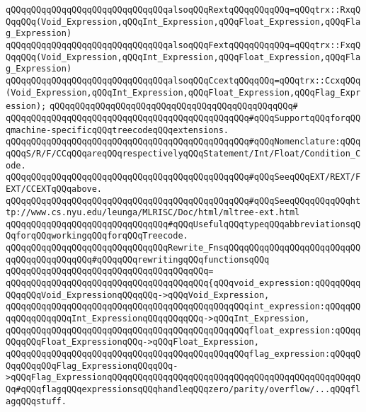 \verb|qQQqqQQqqQQqqQQqqQQqqQQqqQQqqQQqalsoqQQqRextqQQqqQQqqQQq=qQQqtrx::RxqQQqqQQq(Void_Expression,qQQqInt_Expression,qQQqFloat_Expression,qQQqFlag_Expression)|\newline
\verb|qQQqqQQqqQQqqQQqqQQqqQQqqQQqqQQqalsoqQQqFextqQQqqQQqqQQq=qQQqtrx::FxqQQqqQQq(Void_Expression,qQQqInt_Expression,qQQqFloat_Expression,qQQqFlag_Expression)|\newline
\verb|qQQqqQQqqQQqqQQqqQQqqQQqqQQqqQQqalsoqQQqCcextqQQqqQQq=qQQqtrx::CcxqQQq(Void_Expression,qQQqInt_Expression,qQQqFloat_Expression,qQQqFlag_Expression);|\newline
\verb|qQQqqQQqqQQqqQQqqQQqqQQqqQQqqQQqqQQqqQQqqQQqqQQq#|\newline
\verb|qQQqqQQqqQQqqQQqqQQqqQQqqQQqqQQqqQQqqQQqqQQqqQQq#qQQqSupportqQQqforqQQqmachine-specificqQQqtreecodeqQQqextensions.|\newline
\verb|qQQqqQQqqQQqqQQqqQQqqQQqqQQqqQQqqQQqqQQqqQQqqQQq#qQQqNomenclature:qQQqqQQqS/R/F/CCqQQqareqQQqrespectivelyqQQqStatement/Int/Float/Condition_Code.|\newline
\verb|qQQqqQQqqQQqqQQqqQQqqQQqqQQqqQQqqQQqqQQqqQQqqQQq#qQQqSeeqQQqEXT/REXT/FEXT/CCEXTqQQqabove.|\newline
\verb|qQQqqQQqqQQqqQQqqQQqqQQqqQQqqQQqqQQqqQQqqQQqqQQq#qQQqSeeqQQqqQQqqQQqhttp://www.cs.nyu.edu/leunga/MLRISC/Doc/html/mltree-ext.html|\newline
\newline
\verb|qQQqqQQqqQQqqQQqqQQqqQQqqQQqqQQq#qQQqUsefulqQQqtypeqQQqabbreviationsqQQqforqQQqworkingqQQqforqQQqTreecode.|\newline
\newline
\verb|qQQqqQQqqQQqqQQqqQQqqQQqqQQqqQQqRewrite_FnsqQQqqQQqqQQqqQQqqQQqqQQqqQQqqQQqqQQqqQQqqQQq#qQQqqQQqrewritingqQQqfunctionsqQQq|\newline
\verb|qQQqqQQqqQQqqQQqqQQqqQQqqQQqqQQqqQQqqQQq=|\newline
\verb|qQQqqQQqqQQqqQQqqQQqqQQqqQQqqQQqqQQqqQQq{qQQqvoid_expression:qQQqqQQqqQQqqQQqVoid_ExpressionqQQqqQQq->qQQqVoid_Expression,|\newline
\verb|qQQqqQQqqQQqqQQqqQQqqQQqqQQqqQQqqQQqqQQqqQQqqQQqint_expression:qQQqqQQqqQQqqQQqqQQqInt_ExpressionqQQqqQQqqQQq->qQQqInt_Expression,|\newline
\verb|qQQqqQQqqQQqqQQqqQQqqQQqqQQqqQQqqQQqqQQqqQQqqQQqfloat_expression:qQQqqQQqqQQqFloat_ExpressionqQQq->qQQqFloat_Expression,|\newline
\verb|qQQqqQQqqQQqqQQqqQQqqQQqqQQqqQQqqQQqqQQqqQQqqQQqflag_expression:qQQqqQQqqQQqqQQqFlag_ExpressionqQQqqQQq->qQQqFlag_ExpressionqQQqqQQqqQQqqQQqqQQqqQQqqQQqqQQqqQQqqQQqqQQqqQQqqQQq#qQQqflagqQQqexpressionsqQQqhandleqQQqzero/parity/overflow/...qQQqflagqQQqstuff.|\newline
